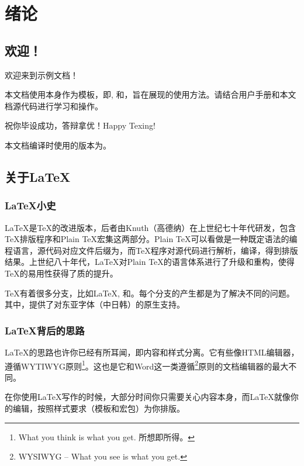 \chapter{绪论}
\section{欢迎！}
欢迎来到\cquthesis{}示例文档！

本文档使用\cquthesis{}本身作为模板，即, 和，旨在展现\cquthesis{}的使用方法。请结合\cquthesis{}用户手册和本文档源代码进行学习和操作。

祝你毕设成功，答辩拿优！Happy Texing!

本文档编译时使用的\cquthesis{}版本为\version{}。

\section{关于\LaTeX{}}


\subsection{\LaTeX{}小史}
\LaTeX{}是\TeX{}的改进版本，后者由Knuth（高德纳）在上世纪七十年代研发，包含\TeX{}排版程序和Plain \TeX{}宏集这两部分。Plain \TeX{}可以看做是一种既定语法的编程语言，源代码对应文件后缀为，而\TeX{}程序对源代码进行解析，编译，得到排版结果。上世纪八十年代，\LaTeX{}对Plain \TeX{}的语言体系进行了升级和重构，使得\TeX{}的易用性获得了质的提升。

\TeX{}有着很多分支，比如\LaTeX{}, \LuaTeX{}和\XeTeX{}。每个分支的产生都是为了解决不同的问题。其中，\XeTeX{}提供了对东亚字体（中日韩）的原生支持。


\subsection{\LaTeX{}背后的思路}

\LaTeX{}的思路也许你已经有所耳闻，即{\heiti{}内容和样式分离。}它有些像HTML编辑器，遵循\textsf{WYTIWYG}原则\footnote{What you think is what you get. 所想即所得。}。这也是它和Word这一类遵循\footnote{\textsf{WYSIWYG} -- What you see is what you get.}原则的文档编辑器的最大不同。

在你使用\LaTeX{}写作的时候，大部分时间你只需要关心内容本身，而\LaTeX{}就像你的编辑，按照样式要求（模板和宏包）为你排版。


